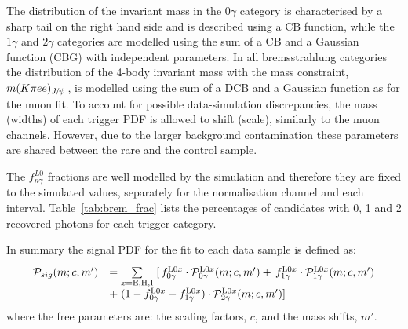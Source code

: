 The distribution of the \mKpiee invariant mass in the $0\gamma$ category is characterised by a sharp tail on the right hand side and is described 
using a CB function, while the $1\gamma$ and $2\gamma$ categories are modelled using the sum of a CB 
and a Gaussian function (CBG) with independent parameters. In all bremsstrahlung categories the distribution of the 4-body 
invariant mass with the \jpsi mass constraint, $m(K\pi ee)_{\jpsi}$, is modelled using the sum of a DCB and a Gaussian 
function as for the muon fit.
%
To account for possible data-simulation discrepancies, the mass (widths) of each trigger PDF is allowed to shift (scale), similarly to the muon channels.
However, due to the larger background contamination these parameters are shared between the rare and the \BdToKstJPsee control sample.


The $f^{L0}_{n\gamma}$ fractions 
are well modelled by the simulation and therefore they are fixed to the simulated values, separately
for the normalisation channel and each \qsq interval. Table~\ref{tab:brem_frac} lists the percentages
of candidates with 0, 1 and 2 recovered photons for each trigger category.

In summary the signal PDF for the fit to each data sample is defined as:
%
\begin{equation}
\begin{array} {ll}
\mathcal{P}_{sig}(m;c,m') & = \sum\limits_{x = {\rm E,H,I}}^{} \;[ \, f^{{\rm L0}x}_{0\gamma} \cdot \mathcal{P}^{{\rm L0}x}_{0\gamma}(m;c,m')  
 + \, f^{{\rm L0}x}_{1\gamma} \cdot \mathcal{P}^{{\rm L0}x}_{1\gamma}(m;c,m') \\ 
& +\; (1 - f^{{\rm L0}x}_{0\gamma} - f^{{\rm L0}x}_{1\gamma}) \cdot \mathcal{P}^{{\rm L0}x}_{2\gamma}(m;c,m')]
\end{array} 
\end{equation}
%
where the free parameters are: the scaling factors, $c$, and the mass shifts, $m'$.



